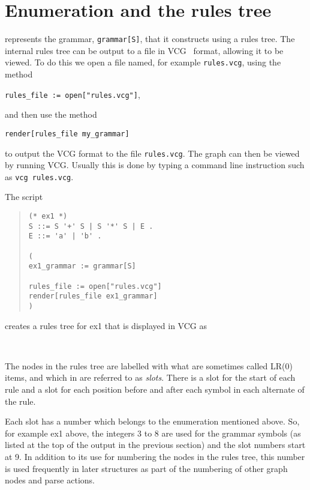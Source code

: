 \section{Enumeration and the rules tree}

\gtb represents the grammar, \verb+grammar[S]+, that 
it constructs using a rules tree. The internal rules tree can be
output to a file in VCG~\cite{SANDER95} format, allowing it to be viewed. 
To do this we open a
file named, for example \verb&rules.vcg&, using the method

\begin{center}\label{p_opn}
\verb&rules_file := open["rules.vcg"]&, 
\end{center}
and then use the method

\begin{center}\label{p_ren}
\verb&render[rules_file my_grammar]& 
\end{center}
to output the VCG format to the file \verb+rules.vcg+. The graph can
then be viewed by running VCG. Usually this is done by
typing a command line instruction such as \verb+vcg rules.vcg+.

The script
\begin{quote}
\begin{verbatim}
(* ex1 *)
S ::= S '+' S | S '*' S | E .
E ::= 'a' | 'b' .

(
ex1_grammar := grammar[S]

rules_file := open["rules.vcg"]   
render[rules_file ex1_grammar]
)
\end{verbatim}
\end{quote}
creates a rules tree for ex1 that is displayed in VCG as 
\begin{center}
\\[2mm]
\end{center}

The nodes in the rules tree are labelled with what are sometimes
called LR(0) items, and which in \gtb are referred to as {\em slots}. 
There is a slot for the start of each rule and a slot for each
position before and after each symbol in each alternate of the rule.

Each slot has a number which belongs to the enumeration
mentioned above. 
So, for example ex1 above, the integers 3 to 8 are used for the
grammar symbols (as listed at the top of the output in the previous
section) and the slot numbers start at 9.
In addition to its use for numbering the nodes in the
rules tree, this number is used frequently in later structures as
part of the numbering of other graph nodes and parse actions.


